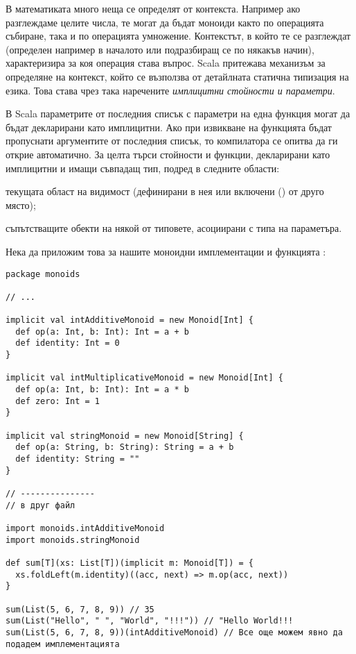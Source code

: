 В математиката много неща се определят от контекста. Например ако разглеждаме целите числа, те могат да бъдат моноиди както по операцията събиране, така и по операцията умножение. Контекстът, в който те се разглеждат (определен например в началото или подразбиращ се по някакъв начин), характеризира за коя операция става въпрос. Scala притежава механизъм за определяне на контекст, който се възползва от детайлната статична типизация на езика. Това става чрез така наречените \emph{имплицитни стойности и параметри}.

В Scala параметрите от последния списък с параметри на една функция могат да бъдат декларирани като имплицитни. Ако при извикване на функцията бъдат пропуснати аргументите от последния списък, то компилатора се опитва да ги открие автоматично. За целта търси стойности и функции, декларирани като имплицитни и имащи съвпадащ тип, подред в следните области:

\begin{enumerate*}
  \item текущата област на видимост (дефинирани в нея или включени () от друго място);
  \item съпътстващите обекти на някой от типовете, асоциирани с типа на параметъра.
\end{enumerate*}

Нека да приложим това за нашите моноидни имплементации и функцията :

\begin{lstlisting}[texcl=true]
package monoids

// ...

implicit val intAdditiveMonoid = new Monoid[Int] {
  def op(a: Int, b: Int): Int = a + b
  def identity: Int = 0
}

implicit val intMultiplicativeMonoid = new Monoid[Int] {
  def op(a: Int, b: Int): Int = a * b
  def zero: Int = 1
}

implicit val stringMonoid = new Monoid[String] {
  def op(a: String, b: String): String = a + b
  def identity: String = ""
}

// ---------------
// в друг файл

import monoids.intAdditiveMonoid
import monoids.stringMonoid

def sum[T](xs: List[T])(implicit m: Monoid[T]) = {
  xs.foldLeft(m.identity)((acc, next) => m.op(acc, next))
}

sum(List(5, 6, 7, 8, 9)) // 35
sum(List("Hello", " ", "World", "!!!")) // "Hello World!!!
sum(List(5, 6, 7, 8, 9))(intAdditiveMonoid) // Все още можем явно да подадем имплементацията
\end{lstlisting}

